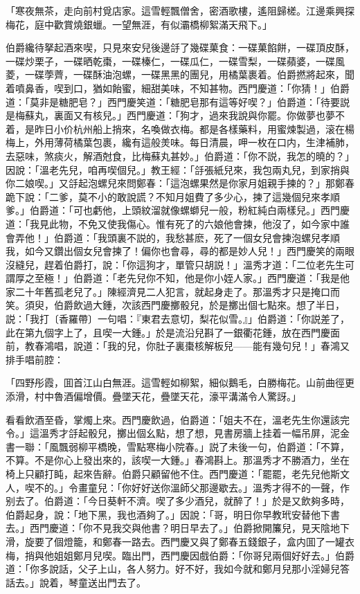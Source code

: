 \begin{myquote}
「寒夜無茶，走向前村覓店家。這雪輕飄僧舍，密酒歌樓，遙阻歸槎。江邊乘興探梅花，庭中歡賞燒銀蠟。一望無涯，有似灞橋柳絮滿天飛下。」
\end{myquote}

伯爵纔待拏起酒來喫，只見來安兒後邊㧱了幾碟菓食：一碟菓餡餅，一碟頂皮酥，一碟炒栗子，一碟晒乾棗，一碟榛仁，一碟瓜仁，一碟雪梨，一碟蘋婆，一碟風菱，一碟荸薺，一碟酥油泡螺，一碟黑黑的團兒，用橘葉裹着。伯爵撚將起來，聞着噴鼻香，喫到口，猶如飴蜜，細甜美味，不知甚物。西門慶道：「你猜！」伯爵道：「莫非是糖肥皂？」西門慶笑道：「糖肥皂那有這等好喫？」伯爵道：「待要説是梅蘇丸，裏面又有核兒。」西門慶道：「狗才，過來我說與你罷。你做夢也夢不着，是昨日小价杭州船上捎來，名喚做衣梅。都是各樣藥料，用蜜煉製過，滚在楊梅上，外用薄荷橘葉包裹，纔有這般羙味。每日清晨，呷一枚在口内，生津補肺，去惡味，煞痰火，解酒尅食，比梅蘇丸甚妙。」伯爵道：「你不説，我怎的曉的？」因說：「溫老先兒，咱再喫個兒。」教王經：「㧱張紙兒來，我包兩丸兒，到家捎與你二娘喫。」又㧱起泡螺兒來問鄭春：「這泡螺果然是你家月姐親手揀的？」那鄭春跪下說：「二爹，莫不小的敢說謊？不知月姐費了多少心，揀了這幾個兒來孝順爹。」伯爵道：「可也虧他，上頭紋溜就像螺螄兒一般，粉紅純白兩樣兒。」西門慶道：「我見此物，不免又使我傷心。惟有死了的六娘他會揀，他沒了，如今家中誰會弄他！」伯爵道：「我頭裏不説的，我愁甚麽，死了一個女兒會揀泡螺兒孝順我，如今又鑽出個女兒會揀了！偏你也會尋，尋的都是妙人兒！」西門慶笑的兩眼沒縫兒，趕着伯爵打，說：「你這狗才，單管只胡説！」溫秀才道：「二位老先生可謂厚之至極！」伯爵道：「老先兒你不知，他是你小姪人家。」西門慶道：「我是他家二十年舊孤老兒了。」陳經濟見二人犯言，就起身走了。那溫秀才只是掩口而笑。須臾，伯爵飲過大鍾，次該西門慶擲骰兒，於是擲出個七點來。想了半日，説：「我打〔香羅帶〕一句唱：『東君去意切，梨花似雪。』」伯爵道：「你説差了，此在第九個字上了，且喫一大鍾。」於是流沿兒斟了一銀衢花鍾，放在西門慶面前，教春鴻唱，說道：「我的兒，你肚子裏棗核解板兒——能有幾句兒！」春鴻又排手唱前腔：

\begin{myquote}
「四野彤霞，囬首江山白無涯。這雪輕如柳絮，細似鵝毛，白勝梅花。山前曲徑更添滑，村中魯酒偏增價。疊墜天花，疊墜天花，濠平溝滿令人驚訝。」
\end{myquote}

看看飲酒至昏，掌燭上來。西門慶飲過，伯爵道：「姐夫不在，溫老先生你還該完令。」這溫秀才㧱起骰兒，擲出個幺點，想了想，見書房牆上挂着一幅吊屏，泥金書一聯：「風飄弱柳平橋晚，雪點寒梅小院春。」説了未後一句，伯爵道：「不算，不算。不是你心上發出來的，該喫一大鍾。」春鴻斟上。那溫秀才不勝酒力，坐在椅上只顧打盹，起來告辭。伯爵只顧留他不住。西門慶道：「罷罷，老先兒他斯文人，喫不的。」令畫童兒：「你好好送你溫師父那邊歇去。」溫秀才得不的一聲，作别去了。伯爵道：「今日葵軒不濟。喫了多少酒兒，就醉了！」於是又飲夠多時，伯爵起身，說：「地下黑，我也酒夠了。」因說：「哥，明日你早教玳安替他下書去。」西門慶道：「你不見我交與他書？明日早去了。」伯爵掀開簾兒，見天陰地下滑，旋要了個燈籠，和鄭春一路去。西門慶又與了鄭春五錢銀子，盒内囬了一罐衣梅，捎與他姐姐鄭月兒喫。臨出門，西門慶因戲伯爵：「你哥兒兩個好好去。」伯爵道：「你多說話，父子上山，各人努力。好不好，我如今就和鄭月兒那小淫婦兒答話去。」說着，琴童送出門去了。

